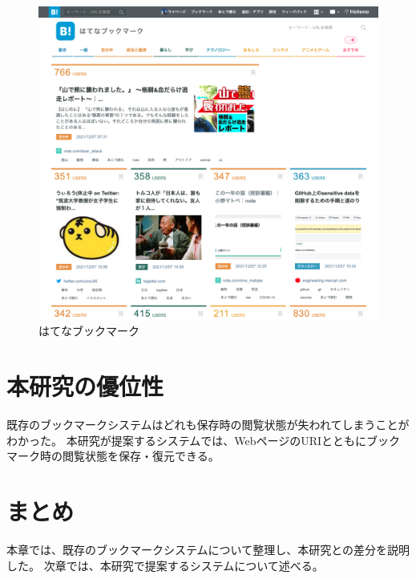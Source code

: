 \begin{figure}[htbp]
  \caption{はてなブックマーク}
  \label{fig:hatena-bookmark}
  \begin{center}
    \includegraphics[bb=0 0 1020 940,width=15cm]{img/020_related_works/hatena-bookmark.pdf}
  \end{center}
\end{figure}

\section{本研究の優位性}
既存のブックマークシステムはどれも保存時の閲覧状態が失われてしまうことがわかった。
本研究が提案するシステムでは、WebページのURIとともにブックマーク時の閲覧状態を保存・復元できる。

\section{まとめ}
本章では、既存のブックマークシステムについて整理し、本研究との差分を説明した。
次章では、本研究で提案するシステムについて述べる。